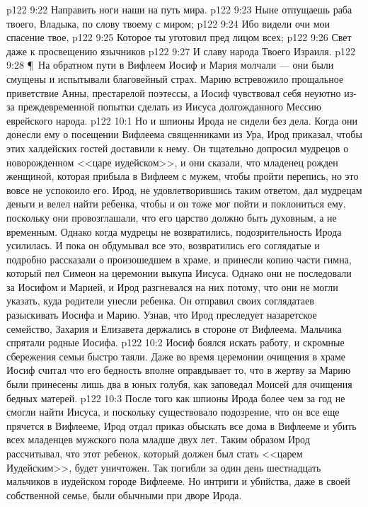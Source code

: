 \vs p122 9:22 Направить ноги наши на путь мира.
\vs p122 9:23 Ныне отпущаешь раба твоего, Владыка, по слову твоему с миром;
\vs p122 9:24 Ибо видели очи мои спасение твое,
\vs p122 9:25 Которое ты уготовил пред лицом всех;
\vs p122 9:26 Свет даже к просвещению язычников
\vs p122 9:27 И славу народа Твоего Израиля.
\vs p122 9:28 \P\ На обратном пути в Вифлеем Иосиф и Мария молчали --- они были смущены и испытывали благовейный страх. Марию встревожило прощальное приветствие Анны, престарелой поэтессы, а Иосиф чувствовал себя неуютно из\hyp{}за преждевременной попытки сделать из Иисуса долгожданного Мессию еврейского народа.
\vs p122 10:1 Но и шпионы Ирода не сидели без дела. Когда они донесли ему о посещении Вифлеема священниками из Ура, Ирод приказал, чтобы этих халдейских гостей доставили к нему. Он тщательно допросил мудрецов о новорожденном <<царе иудейском>>, и они сказали, что младенец рожден женщиной, которая прибыла в Вифлеем с мужем, чтобы пройти перепись, но это вовсе не успокоило его. Ирод, не удовлетворившись таким ответом, дал мудрецам деньги и велел найти ребенка, чтобы и он тоже мог пойти и поклониться ему, поскольку они провозглашали, что его царство должно быть духовным, а не временным. Однако когда мудрецы не возвратились, подозрительность Ирода усилилась. И пока он обдумывал все это, возвратились его соглядатые и подробно рассказали о произошедшем в храме, и принесли копию части гимна, который пел Симеон на церемонии выкупа Иисуса. Однако они не последовали за Иосифом и Марией, и Ирод разгневался на них потому, что они не могли указать, куда родители унесли ребенка. Он отправил своих соглядатаев разыскивать Иосифа и Марию. Узнав, что Ирод преследует назаретское семейство, Захария и Елизавета держались в стороне от Вифлеема. Мальчика спрятали родные Иосифа.
\vs p122 10:2 Иосиф боялся искать работу, и скромные сбережения семьи быстро таяли. Даже во время церемонии очищения в храме Иосиф считал что его бедность вполне оправдывает то, что в жертву за Марию были принесены лишь два в юных голубя, как заповедал Моисей для очищения бедных матерей.
\vs p122 10:3 После того как шпионы Ирода более чем за год не смогли найти Иисуса, и поскольку существовало подозрение, что он все еще прячется в Вифлееме, Ирод отдал приказ обыскать все дома в Вифлееме и убить всех младенцев мужского пола младше двух лет. Таким образом Ирод рассчитывал, что этот ребенок, который должен был стать <<царем Иудейским>>, будет уничтожен. Так погибли за один день шестнадцать мальчиков в иудейском городе Вифлееме. Но интриги и убийства, даже в своей собственной семье, были обычными при дворе Ирода.
